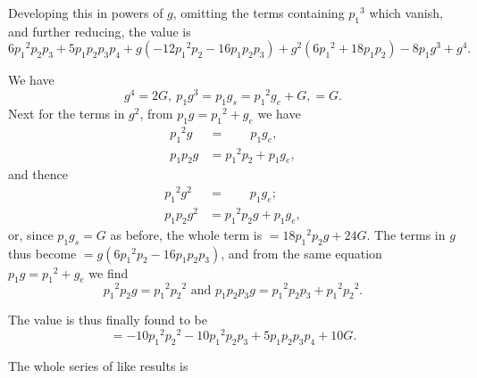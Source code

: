 \documentclass[11pt,a4paper,english]{article}
\theoremstyle{plain}
\begin{document}
Developing this in powers of $g$, omitting the terms containing ${p_1}^3$ which vanish, and further reducing, the value is
\[
6{p_1}^2p_2p_3 + 5p_1p_2p_3p_4 + g(-12{p_1}^2p_2 - 16p_1p_2p_3) + g^2(6{p_1}^2 + 18p_1p_2) - 8p_1g^3 + g^4.
\]

We have
\[
g^4 = 2G,\ p_1g^3 = p_1g_s = {p_1}^2g_e + G, = G.
\]
Next for the terms in $g^2$, from $p_1g = {p_1}^2 + g_e$ we have
\begin{align*}
{p_1}^2g &= \qquad p_1g_e, \\
p_1p_2g &= {p_1}^2p_2 + p_1g_e,
\end{align*}
and thence
\begin{align*}
{p_1}^2g^2 &= \qquad p_1g_e; \\
p_1p_2g^2 &= {p_1}^2p_2g + p_1g_e,
\end{align*}
or, since $p_1g_s = G$ as before, the whole term is $= 18{p_1}^2p_2g + 24G$. The terms in $g$ thus become $= g(6{p_1}^2p_2 - 16p_1p_2p_3)$, and from the same equation $p_1g = {p_1}^2 + g_e$ we find
\[
{p_1}^2p_2g = {p_1}^2{p_2}^2 \text{ and } p_1p_2p_3g = {p_1}^2p_2p_3 + {p_1}^2{p_2}^2.
\]

The value is thus finally found to be
\[
= -10{p_1}^2{p_2}^2 - 10{p_1}^2p_2p_3 + 5p_1p_2p_3p_4 + 10G.
\]

The whole series of like results is
\end{document}

